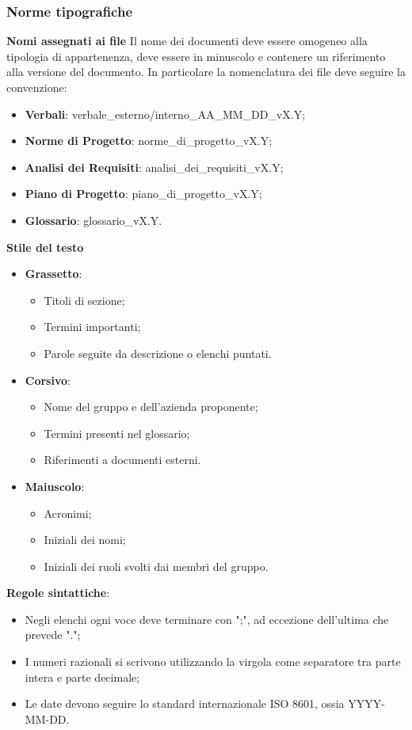 \subsubsection{Norme tipografiche}
\textbf{Nomi assegnati ai file} Il nome dei documenti deve essere omogeneo alla tipologia di appartenenza, deve essere in minuscolo
e contenere un riferimento alla versione del documento. In particolare la nomenclatura dei file deve seguire la convenzione:
\begin{itemize}
	\item \textbf{Verbali}: verbale\_esterno/interno\_AA\_MM\_DD\_vX.Y;
	\item \textbf{Norme di Progetto}: norme\_di\_progetto\_vX.Y;
	\item \textbf{Analisi dei Requisiti}: analisi\_dei\_requisiti\_vX.Y;
	\item \textbf{Piano di Progetto}: piano\_di\_progetto\_vX.Y;
	\item \textbf{Glossario}: glossario\_vX.Y.
\end{itemize}
\textbf{Stile del testo}
\begin{itemize}
	\item \textbf{Grassetto}:
	      \begin{itemize}
		      \item Titoli di sezione;
		      \item Termini importanti;
		      \item Parole seguite da descrizione o elenchi puntati.
	      \end{itemize}
	\item \textbf{Corsivo}:
	      \begin{itemize}
		      \item Nome del gruppo e dell'azienda proponente;
		      \item Termini presenti nel glossario;
		      \item Riferimenti a documenti esterni.
	      \end{itemize}
	\item \textbf{Maiuscolo}:
	      \begin{itemize}
		      \item Acronimi;
		      \item Iniziali dei nomi;
		      \item Iniziali dei ruoli svolti dai membri del gruppo.
	      \end{itemize}
\end{itemize}
\textbf{Regole sintattiche}:
\begin{itemize}
	\item Negli elenchi ogni voce deve terminare con ";", ad eccezione dell'ultima che prevede ".";
	\item I numeri razionali si scrivono utilizzando la virgola come separatore tra parte intera e parte decimale;
	\item Le date devono seguire lo standard internazionale ISO 8601, ossia YYYY-MM-DD.
\end{itemize}

